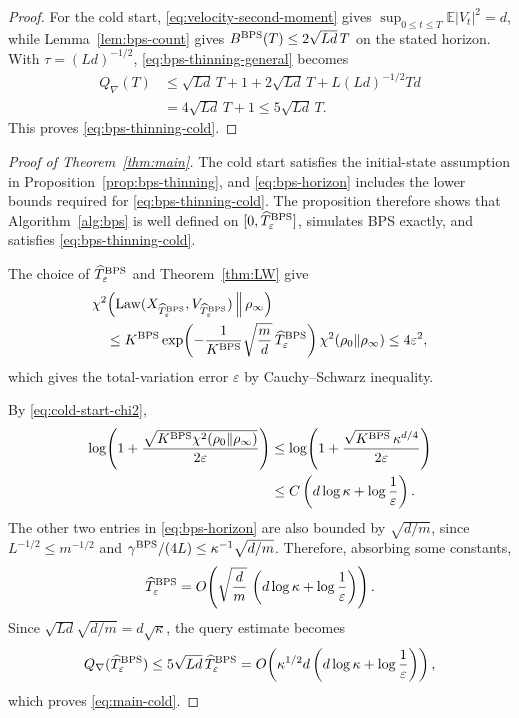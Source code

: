 \documentclass{amsart}
\theoremstyle{plain}
\theoremstyle{definition}
\theoremstyle{remark}
\newcommand{\EE}{\mathbb{E}}
\newcommand{\abs}[1]{\lvert#1\rvert}
\newcommand{\E}{\EE}
\newcommand{\1}{\mathbf 1}
\DeclareMathOperator{\Law}{Law}
\newcommand{\bps}{{\rm BPS}}
\begin{document}
\begin{proof}
For the cold start, \eqref{eq:velocity-second-moment} gives
$\sup_{0\le t\le T}\E\abs{V_t}^2=d$, while
Lemma~\ref{lem:bps-count} gives
$B^{\bps}(T)\le2\sqrt{Ld}\,T$ on the stated horizon.  With
$\tau=(Ld)^{-1/2}$, \eqref{eq:bps-thinning-general} becomes
\[
\begin{aligned}
        Q_\nabla(T)
        &\le\sqrt{Ld}\,T+1
          +2\sqrt{Ld}\,T
          +L(Ld)^{-1/2}Td\\
        &=4\sqrt{Ld}\,T+1
        \le5\sqrt{Ld}\,T.
\end{aligned}
\]
This proves \eqref{eq:bps-thinning-cold}.
\end{proof}

\begin{proof}[Proof of Theorem~\ref{thm:main}]
The cold start satisfies the initial-state assumption in
Proposition~\ref{prop:bps-thinning}, and \eqref{eq:bps-horizon} includes the
lower bounds required for \eqref{eq:bps-thinning-cold}.  The proposition
therefore shows that
Algorithm~\ref{alg:bps} is well defined on
$[0,\widehat T_\varepsilon^{\bps}]$, simulates BPS exactly, and satisfies
\eqref{eq:bps-thinning-cold}.

The choice of $\widehat T_\varepsilon^{\bps}$  and Theorem~\ref{thm:LW} give
\[
\begin{aligned}
&\chi^2\!\left(
  \Law(X_{\widehat T_\varepsilon^{\bps}},
       V_{\widehat T_\varepsilon^{\bps}})
  \,\middle\Vert\,\rho_\infty\right)\\
&\quad\le
K^{\bps}
\exp\!\left(
  -\frac{1}{K^{\bps}}\sqrt{\frac md}\,
   \widehat T_\varepsilon^{\bps}
\right)
\chi^2(\rho_0\Vert\rho_\infty) \le4\varepsilon^2,
\end{aligned}
\]
which gives the total-variation error $\varepsilon$ by Cauchy–Schwarz inequality.

By \eqref{eq:cold-start-chi2},
\[
\begin{aligned}
\log\!\left(
  1+
  \frac{\sqrt{K^{\bps}\chi^2(\rho_0\Vert\rho_\infty)}}
       {2\varepsilon}
\right)
&\le
\log\!\left(
  1+\frac{\sqrt{K^{\bps}}\,\kappa^{d/4}}{2\varepsilon}
\right)\\
&\le C\left(d\log\kappa+\log\frac1\varepsilon\right).
\end{aligned}
\]
The other two entries in \eqref{eq:bps-horizon} are also bounded by
$\sqrt{d/m}$, since $L^{-1/2}\le m^{-1/2}$ and
$\gamma^{\bps}/(4L)\le\kappa^{-1}\sqrt{d/m}$.
Therefore, absorbing some constants,
\[
        \widehat T_\varepsilon^{\bps}
        =O\!\left(\sqrt{\frac dm}\,
          \left(d\log\kappa+\log\frac1\varepsilon\right)\right).
\]
Since
$\sqrt{Ld}\sqrt{d/m}=d\sqrt\kappa$, the query estimate becomes
\[
        Q_\nabla(\widehat T_\varepsilon^{\bps})
        \le5\sqrt{Ld}\,\widehat T_\varepsilon^{\bps}
        =O\!\left(
          \kappa^{1/2}d
          \left(d\log\kappa+\log\frac1\varepsilon\right)\right),
\]
which proves \eqref{eq:main-cold}.
\end{proof}
\end{document}
